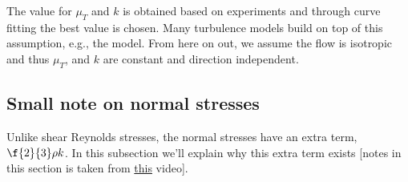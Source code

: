 The value for \(\mu_T\) and \(k\) is obtained based on experiments and through curve fitting the best value is chosen.
Many turbulence models build on top of this assumption, e.g., the \keModel model.
From here on out, we assume the flow is isotropic and thus \(\mu_T\), and \(k\) are constant and direction independent.

\subsection{Small note on normal stresses}

Unlike shear Reynolds stresses, the normal stresses have an extra term, \(\f{2}{3} \rho k\).
In this subsection we'll explain why this extra term exists
[notes in this section is taken from \href{https://youtu.be/SVYXNICeNWA}{\color{blue}this} video].

